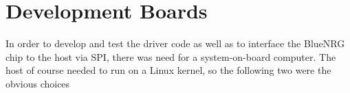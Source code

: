 \section{Development Boards}
In order to develop and test the driver code as well as to interface the BlueNRG chip to the host via SPI, there was need for a system-on-board computer. The host of course needed to run on a Linux kernel, so the following two were the obvious choices


